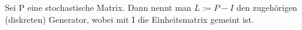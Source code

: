 Sei P eine stochastische Matrix. Dann nennt man $L := P-I$ den zugehörigen (diskreten) Generator, wobei mit I die Einheitsmatrix gemeint ist.